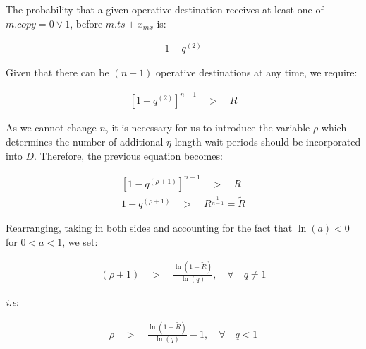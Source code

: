 \begin{description}
        The probability that a given operative destination receives at least one of $m.copy = 0 \lor 1$, before $m.ts + x_{mx}$ is:
        
        \begin{equation}
            \begin{aligned}
                1 - q^{\left( 2 \right)}
            \end{aligned}
        \end{equation}
        
        Given that there can be $(n - 1)$ operative destinations at any time, we require:
        
        \begin{equation}
            \begin{aligned}
                \left[1 - q^{\left(2 \right)}\right]^{n - 1} \quad > \quad R
            \end{aligned}
        \end{equation}        
        
        As we cannot change $n$, it is necessary for us to introduce the variable $\rho$ which determines the number of additional $\eta$ length wait periods should be incorporated into $D$.  Therefore, the previous equation becomes:
        
         \begin{equation}
            \begin{split}
                \left[1 - q^{\left(\rho + 1 \right)}\right]^{n - 1} \quad > \quad R \\
                1 - q^{\left(\rho + 1\right)} \quad > \quad R^{\frac{1}{n-1}} = \tilde{R}
            \end{split}
        \end{equation}   
        
        Rearranging, taking in both sides and accounting for the fact that $\ln(a) < 0$ for  $0 < a < 1$, we set:
        
        \begin{equation}
            \begin{aligned}
                \left(\rho + 1\right) \quad > \quad \frac{\ln\left( 1 - \tilde{R} \right)}{\ln\left(q \right)}, \quad \forall \quad q \neq 1
            \end{aligned}
        \end{equation}

        \emph{i.e}:        
        
        \begin{equation} \label{eq:rho_ie}
            \begin{aligned}
                \rho \quad > \quad \frac{\ln\left(1 - \tilde{R}\right)}{\ln(q)} - 1, \quad \forall \quad q < 1
            \end{aligned}
        \end{equation}
               

\end{description}
